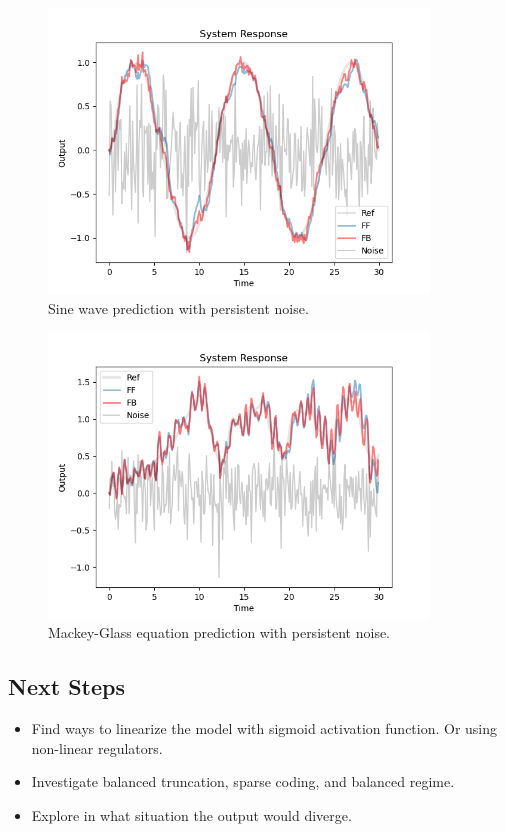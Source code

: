 \documentclass[12pt, a4paper]{article}
\begin{document}
\begin{figure}[H]
    \centering
    \includegraphics[width=0.9\textwidth]{fig/sin_lin_pers.png}
    \caption{Sine wave prediction with persistent noise.}
    \label{fig:1}
\end{figure}

\begin{figure}[H]
    \centering
    \includegraphics[width=0.9\textwidth]{fig/MG_lin_pers.png}
    \caption{Mackey-Glass equation prediction with persistent noise.}
    \label{fig:2}
\end{figure}

\subsection*{Next Steps}

\begin{itemize}
    \item Find ways to linearize the model with sigmoid activation function. Or using non-linear regulators.
    \item Investigate balanced truncation, sparse coding, and balanced regime.
    \item Explore in what situation the output would diverge.
\end{itemize}
\end{document}
